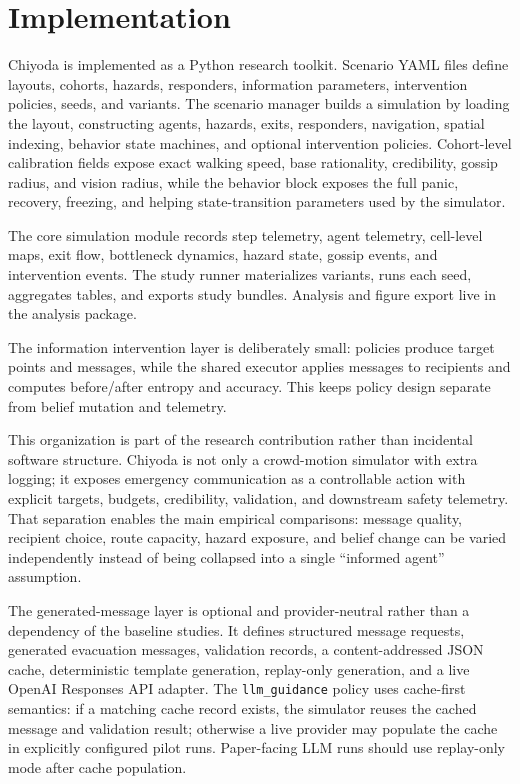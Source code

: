 \section{Implementation}
\label{sec:implementation}

Chiyoda is implemented as a Python research toolkit. Scenario YAML files define
layouts, cohorts, hazards, responders, information parameters, intervention
policies, seeds, and variants. The scenario manager builds a simulation by
loading the layout, constructing agents, hazards, exits, responders,
navigation, spatial indexing, behavior state machines, and optional
intervention policies. Cohort-level calibration fields expose exact walking
speed, base rationality, credibility, gossip radius, and vision radius, while
the behavior block exposes the full panic, recovery, freezing, and helping
state-transition parameters used by the simulator.

The core simulation module records step telemetry, agent telemetry, cell-level
maps, exit flow, bottleneck dynamics, hazard state, gossip events, and
intervention events. The study runner materializes variants, runs each seed,
aggregates tables, and exports study bundles. Analysis and figure export live
in the analysis package.

The information intervention layer is deliberately small: policies produce
target points and messages, while the shared executor applies
messages to recipients and computes before/after entropy and accuracy. This
keeps policy design separate from belief mutation and telemetry.

This organization is part of the research contribution rather than incidental
software structure. Chiyoda is not only a crowd-motion simulator with extra
logging; it exposes emergency communication as a controllable action with
explicit targets, budgets, credibility, validation, and downstream safety
telemetry. That separation enables the main empirical comparisons:
message quality, recipient choice, route capacity, hazard exposure, and belief
change can be varied independently instead of being collapsed into a single
``informed agent'' assumption.

The generated-message layer is optional and provider-neutral rather than a
dependency of the baseline studies. It defines structured message requests,
generated evacuation messages, validation records, a content-addressed JSON
cache, deterministic template generation, replay-only generation, and a live
OpenAI Responses API adapter. The \texttt{llm\_guidance} policy uses
cache-first semantics: if a matching cache record exists, the simulator reuses
the cached message and validation result; otherwise a live provider may
populate the cache in explicitly configured pilot runs. Paper-facing LLM runs
should use replay-only mode after cache population.

